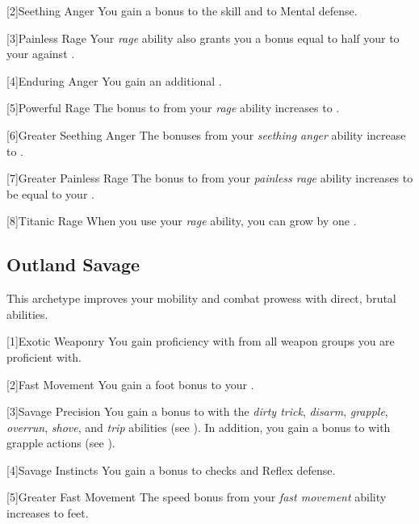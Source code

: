         [2]{Seething Anger}
        You gain a  bonus to the  skill and to Mental defense.

        [3]{Painless Rage} Your \textit{rage} ability also grants you a bonus equal to half your  to your  against .

        [4]{Enduring Anger} You gain an additional .

        [5]{Powerful Rage} The bonus to  from your \textit{rage} ability increases to .

        [6]{Greater Seething Anger}
        The bonuses from your \textit{seething anger} ability increase to .

        [7]{Greater Painless Rage} The bonus to  from your \textit{painless rage} ability increases to be equal to your .

        [8]{Titanic Rage}
        When you use your \textit{rage} ability, you can grow by one .

    \subsection{Outland Savage}
        This archetype improves your mobility and combat prowess with direct, brutal abilities.

        [1]{Exotic Weaponry} You gain proficiency with  from all weapon groups you are proficient with.

        [2]{Fast Movement} You gain a  foot bonus to your .

        [3]{Savage Precision} You gain a  bonus to  with the \textit{dirty trick}, \textit{disarm}, \textit{grapple}, \textit{overrun}, \textit{shove}, and \textit{trip} abilities (see ).
        In addition, you gain a  bonus to  with grapple actions (see ).

        [4]{Savage Instincts} You gain a  bonus to  checks and Reflex defense.

        [5]{Greater Fast Movement} The speed bonus from your \textit{fast movement} ability increases to  feet.

